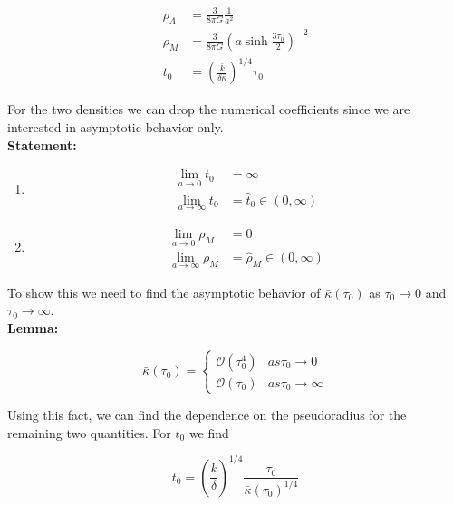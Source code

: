 \documentclass[preprint,notitlepage,amsmath,amssymb,floatfix]{revtex4-1}
\begin{document}
\begin{equation}
\begin{split}
\rho_\Lambda &= \frac{3}{8\pi G}\frac{1}{a^2} \\
\rho_M &= \frac{3}{8\pi G}\left(a\sinh\frac{3\tau_0}{2}\right)^{-2} \\
t_0 &= \left(\frac{\bar k}{\delta\bar\kappa}\right)^{1/4}\tau_0
\end{split}
\end{equation}

\noindent For the two densities we can drop the numerical coefficients since we are interested in asymptotic behavior only. \\
\textbf{Statement:}
\begin{enumerate}
  \item
  \begin{equation}
  \begin{split}
  \lim_{a\to 0} t_0 &= \infty \\
  \lim_{a\to\infty} t_0 &= \hat{t}_0\in\left(0,\infty\right)
  \end{split}
  \end{equation}

  \item
  \begin{equation}
  \begin{split}
  \lim_{a\to 0} \rho_M &= 0 \\
  \lim_{a\to\infty} \rho_M &= \hat{\rho}_M\in\left(0,\infty\right)
  \end{split}
  \end{equation}
\end{enumerate}

\noindent To show this we need to find the asymptotic behavior of $\bar\kappa\left(\tau_0\right)$ as $\tau_0\to 0$ and $\tau_0\to\infty$. \\
\textbf{Lemma:}

\begin{equation}
\bar{\kappa}\left(\tau_0\right) = 
\begin{cases}
\mathcal{O}\left(\tau_0^4\right) & as \tau_0\to 0 \\
\mathcal{O}\left(\tau_0\right) & as \tau_0\to\infty
\end{cases}
\end{equation}

\noindent Using this fact, we can find the dependence on the pseudoradius for the remaining two quantities.  For $t_0$ we find

\begin{equation}
t_0 = \left(\frac{\bar k}{\delta}\right)^{1/4}\frac{\tau_0}{\bar\kappa\left(\tau_0\right)^{1/4}}
\end{equation}
\end{document}
